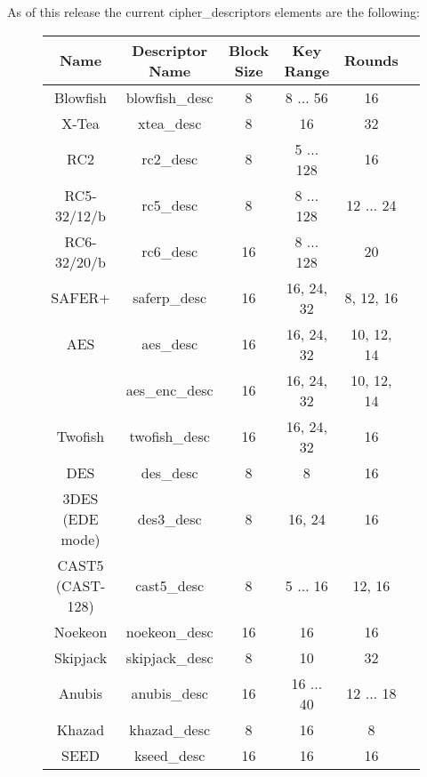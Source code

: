 \documentclass[synpaper]{book}
\begin{document}
As of this release the current cipher\_descriptors elements are the following:
\vfil
{}
       
         
  
\begin{figure}[hpbt]
\begin{small}
\begin{center}
\begin{tabular}{|c|c|c|c|c|c|}
     \hline \textbf{Name} & \textbf{Descriptor Name} & \textbf{Block Size} & \textbf{Key Range} & \textbf{Rounds} \\
     \hline Blowfish & blowfish\_desc & 8 & 8 $\ldots$ 56 & 16 \\
     \hline X-Tea & xtea\_desc & 8 & 16 & 32 \\
     \hline RC2 & rc2\_desc & 8 & 5 $\ldots$ 128 & 16 \\
     \hline RC5-32/12/b & rc5\_desc & 8 & 8 $\ldots$ 128 & 12 $\ldots$ 24 \\
     \hline RC6-32/20/b & rc6\_desc & 16 & 8 $\ldots$ 128 & 20 \\
     \hline SAFER+ & saferp\_desc &16 & 16, 24, 32 & 8, 12, 16 \\
     \hline AES & aes\_desc & 16 & 16, 24, 32 & 10, 12, 14 \\
                & aes\_enc\_desc & 16 & 16, 24, 32 & 10, 12, 14 \\
     \hline Twofish & twofish\_desc & 16 & 16, 24, 32 & 16 \\
     \hline DES & des\_desc & 8 & 8 & 16 \\
     \hline 3DES (EDE mode) & des3\_desc & 8 & 16, 24 & 16 \\
     \hline CAST5 (CAST-128) & cast5\_desc & 8 & 5 $\ldots$ 16 & 12, 16 \\
     \hline Noekeon & noekeon\_desc & 16 & 16 & 16 \\
     \hline Skipjack & skipjack\_desc & 8 & 10 & 32 \\
     \hline Anubis & anubis\_desc & 16 & 16 $\ldots$ 40 & 12 $\ldots$ 18 \\
     \hline Khazad & khazad\_desc & 8 & 16 & 8 \\
     \hline SEED   & kseed\_desc & 16 & 16 & 16 \\

\end{tabular}
\end{center}
\end{small}
\end{figure}
\end{document}
